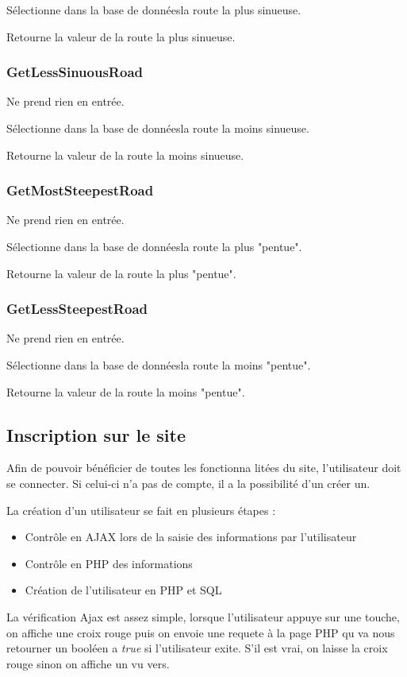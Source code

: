 \documentclass[a4paper]{article}
\newcommand{\bdd}{base de données}
\begin{document}
Sélectionne dans la \bdd  la route la plus sinueuse.

Retourne la valeur de la route la plus sinueuse.

\subsubsection{GetLessSinuousRoad}
Ne prend rien en entrée.

Sélectionne dans la \bdd la route la moins sinueuse.

Retourne la valeur de la route la moins sinueuse.

\subsubsection{GetMostSteepestRoad}
Ne prend rien en entrée.

Sélectionne dans la \bdd la route la plus "pentue".

Retourne la valeur de la route la plus "pentue".

\subsubsection{GetLessSteepestRoad}
Ne prend rien en entrée.

Sélectionne dans la \bdd la route la moins "pentue".

Retourne la valeur de la route la moins "pentue".

\newpage
\subsection{Inscription sur le site}

Afin de pouvoir bénéficier de toutes les fonctionna litées du site, l'utilisateur doit se connecter. Si celui-ci n'a pas de compte, il a la possibilité d'un créer un. 

La création d'un utilisateur se fait en plusieurs étapes :
\begin{itemize}
    \item Contrôle en AJAX lors de la saisie des informations par l'utilisateur
    \item Contrôle en PHP des informations
    \item Création de l'utilisateur en PHP et SQL
\end{itemize}

La vérification Ajax est assez simple, lorsque l'utilisateur appuye sur une touche, on affiche une croix rouge puis on envoie une requete à la page PHP qu va nous retourner un booléen a \emph{true} si l'utilisateur exite. S'il est vrai, on laisse la croix rouge sinon on affiche un vu vers.
\end{document}
